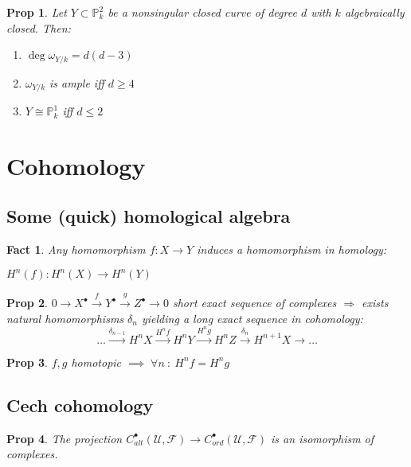 \documentclass[a4paper, 12pt]{article}
\newcommand{\ca}[1]{\mathcal{#1}}
\newcommand{\caf}{\mathcal{F}}
\newcommand{\bbp}{\mathbb{P}}
\newtheorem*{prop}{Prop}
\newtheorem*{fact}{Fact}
\begin{document}
	\begin{prop}
		Let $ Y \subset \bbp^2_k $ be a nonsingular closed curve of degree $ d $ with $ k $ algebraically closed. Then:
		\begin{enumerate}
			\item $ \deg \omega_{Y/k} = d(d-3) $
			\item $ \omega_{Y/k} $ is ample iff $ d \geq 4 $
			\item $ Y \cong \bbp^1_k $ iff $ d \le 2 $
		\end{enumerate}
	\end{prop}
	
	
	
	
	
	\section{Cohomology}
	
	
	\subsection{Some (quick) homological algebra}
	
	\begin{fact}
		Any homomorphism $ f:X \rightarrow Y $ induces a homomorphism in homology:
		
		$ H^n(f): H^n(X) \rightarrow H^n(Y) $
	\end{fact}
	
	\begin{prop}
		$ 0 \rightarrow X^{\bullet} \xrightarrow{f} Y^{\bullet} \xrightarrow{g} Z^{\bullet} \rightarrow 0 $ short exact sequence of complexes $ \Rightarrow $ exists natural homomorphisms $ \delta_n $ yielding a long exact sequence in cohomology:
		\[ \dots \xrightarrow{\delta_{n-1}} H^nX \xrightarrow{H^nf} H^nY \xrightarrow{H^ng} H^nZ \xrightarrow{\delta_n} H^{n+1}X \rightarrow \dots  \]
	\end{prop}
	
	\begin{prop}
		$ f,g $ homotopic $ \implies \; \forall n \: : \: H^nf = H^ng $
	\end{prop}
	
	
	
	
	
	\subsection{Cech cohomology}
	
	\begin{prop}
		The projection $ C^{\bullet}_{alt}(\ca{U},\caf) \rightarrow C^{\bullet}_{ord} (\ca{U}, \caf) $ is an isomorphism of complexes.
	\end{prop}
	
\end{document}
